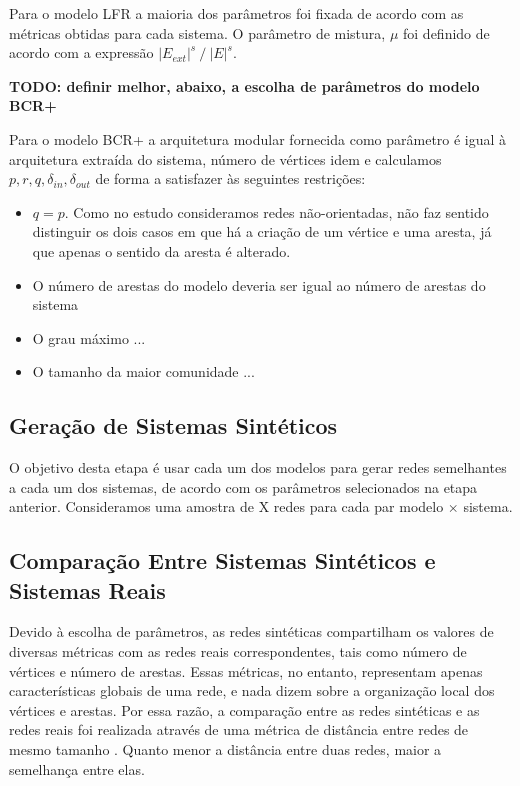 \documentclass{acm_proc_article-sp}
\begin{document}
Para o modelo LFR a maioria dos parâmetros foi fixada de acordo com as métricas obtidas para cada sistema. O parâmetro de mistura, $\mu$ foi definido de acordo com a expressão $|E_{ext}|^s~/~|E|^s$.

\textbf{TODO: definir melhor, abaixo, a escolha de parâmetros do modelo BCR+}

Para o modelo BCR+ a arquitetura modular fornecida como parâmetro é igual à arquitetura extraída do sistema, número de vértices idem e calculamos $p, r, q, \delta_{in}, \delta_{out}$ de forma a satisfazer às seguintes restrições:
\begin{itemize}
  \item $q = p$. Como no estudo consideramos redes não-orientadas, não faz sentido distinguir os dois casos em que há a criação de um vértice e uma aresta, já que apenas o sentido da aresta é alterado.
  \item O número de arestas do modelo deveria ser igual ao número de arestas do sistema
  \item O grau máximo ...
  \item O tamanho da maior comunidade ...
\end{itemize}

\subsection{Geração de Sistemas Sintéticos}

O objetivo desta etapa é usar cada um dos modelos para gerar redes semelhantes a cada um dos sistemas, de acordo com os parâmetros selecionados na etapa anterior. Consideramos uma amostra de X redes para cada par modelo $\times$ sistema.


\subsection{Comparação Entre Sistemas Sintéticos e Sistemas Reais}

Devido à escolha de parâmetros, as redes sintéticas compartilham os valores de diversas métricas com as redes reais correspondentes, tais como número de vértices e número de arestas. Essas métricas, no entanto, representam apenas características globais de uma rede, e nada dizem sobre a organização local dos vértices e arestas. Por essa razão, a comparação entre as redes sintéticas e as redes reais foi realizada através de uma métrica de distância entre redes de mesmo tamanho \cite{Andrade2008}. Quanto menor a distância entre duas redes, maior a semelhança entre elas.
\end{document}
